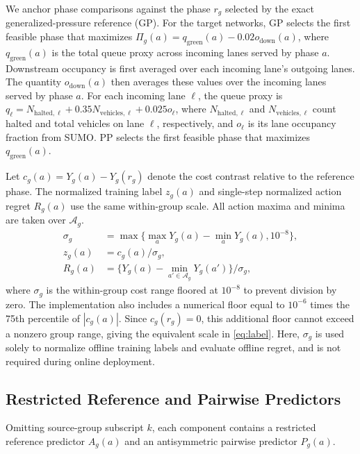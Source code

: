 \documentclass[letterpaper,journal]{IEEEtran}
\begin{document}
We anchor phase comparisons against the phase $r_g$ selected by the exact generalized-pressure reference (GP). For the target networks, GP selects the first feasible phase that maximizes $\Pi_g(a)=q_{\mathrm{green}}(a)-0.02o_{\mathrm{down}}(a)$, where $q_{\mathrm{green}}(a)$ is the total queue proxy across incoming lanes served by phase $a$. Downstream occupancy is first averaged over each incoming lane's outgoing lanes. The quantity $o_{\mathrm{down}}(a)$ then averages these values over the incoming lanes served by phase $a$. For each incoming lane $\ell$, the queue proxy is $q_\ell=N_{\mathrm{halted},\ell}+0.35N_{\mathrm{vehicles},\ell}+0.025o_\ell$, where $N_{\mathrm{halted},\ell}$ and $N_{\mathrm{vehicles},\ell}$ count halted and total vehicles on lane $\ell$, respectively, and $o_\ell$ is its lane occupancy fraction from SUMO. PP selects the first feasible phase that maximizes $q_{\mathrm{green}}(a)$.

Let $c_g(a)=Y_g(a)-Y_g(r_g)$ denote the cost contrast relative to the reference phase. The normalized training label $z_g(a)$ and single-step normalized action regret $R_g(a)$ use the same within-group scale. All action maxima and minima are taken over $\mathcal A_g$.
\begin{align}
 \sigma_g&=\max\{\max_aY_g(a)-\min_aY_g(a),10^{-8}\},\nonumber\\
 z_g(a)&=c_g(a)/\sigma_g,\label{eq:label}\\
 R_g(a)&=\{Y_g(a)-\min_{a'\in\mathcal A_g}Y_g(a')\}/\sigma_g,
 \label{eq:regret}
\end{align}
where $\sigma_g$ is the within-group cost range floored at $10^{-8}$ to prevent division by zero. The implementation also includes a numerical floor equal to $10^{-6}$ times the 75th percentile of $|c_g(a)|$. Since $c_g(r_g)=0$, this additional floor cannot exceed a nonzero group range, giving the equivalent scale in \eqref{eq:label}. Here, $\sigma_g$ is used solely to normalize offline training labels and evaluate offline regret, and is not required during online deployment.

\subsection{Restricted Reference and Pairwise Predictors}
Omitting source-group subscript $k$, each component contains a restricted reference predictor $A_g(a)$ and an antisymmetric pairwise predictor $P_g(a)$.
\end{document}
